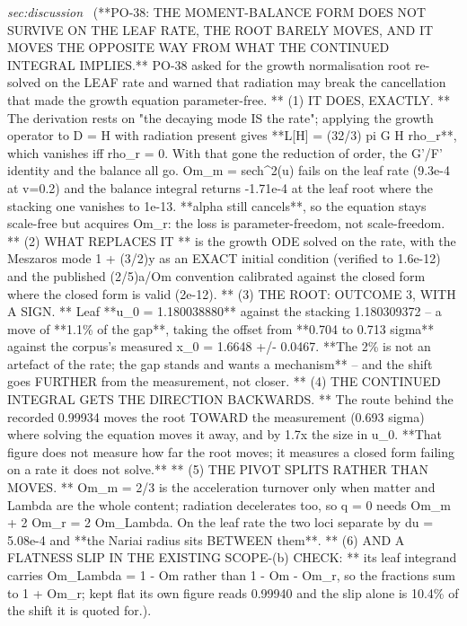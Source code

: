 \begin{description}
\textit{sec:discussion} \ (**PO-38: THE MOMENT-BALANCE FORM DOES NOT SURVIVE ON THE LEAF RATE, THE ROOT BARELY MOVES, AND IT MOVES THE OPPOSITE WAY FROM WHAT THE CONTINUED INTEGRAL IMPLIES.** PO-38 asked for the growth normalisation root re-solved on the LEAF rate and warned that radiation may break the cancellation that made the growth equation parameter-free. ** (1) IT DOES, EXACTLY. ** The derivation rests on "the decaying mode IS the rate"; applying the growth operator to D = H with radiation present gives **L[H] = (32/3) pi G H rho\_r**, which vanishes iff rho\_r = 0. With that gone the reduction of order, the G'/F' identity and the balance all go. Om\_m = sech\textasciicircum{}2(u) fails on the leaf rate (9.3e-4 at v=0.2) and the balance integral returns -1.71e-4 at the leaf root where the stacking one vanishes to 1e-13. **alpha still cancels**, so the equation stays scale-free but acquires Om\_r: the loss is parameter-freedom, not scale-freedom. ** (2) WHAT REPLACES IT ** is the growth ODE solved on the rate, with the Meszaros mode 1 + (3/2)y as an EXACT initial condition (verified to 1.6e-12) and the published (2/5)a/Om convention calibrated against the closed form where the closed form is valid (2e-12). ** (3) THE ROOT: OUTCOME 3, WITH A SIGN. ** Leaf **u\_0 = 1.180038880** against the stacking 1.180309372 -- a move of **1.1\% of the gap**, taking the offset from **0.704 to 0.713 sigma** against the corpus's measured x\_0 = 1.6648 +/- 0.0467. **The 2\% is not an artefact of the rate; the gap stands and wants a mechanism** -- and the shift goes FURTHER from the measurement, not closer. ** (4) THE CONTINUED INTEGRAL GETS THE DIRECTION BACKWARDS. ** The route behind the recorded 0.99934 moves the root TOWARD the measurement (0.693 sigma) where solving the equation moves it away, and by 1.7x the size in u\_0. **That figure does not measure how far the root moves; it measures a closed form failing on a rate it does not solve.** ** (5) THE PIVOT SPLITS RATHER THAN MOVES. ** Om\_m = 2/3 is the acceleration turnover only when matter and Lambda are the whole content; radiation decelerates too, so q = 0 needs Om\_m + 2 Om\_r = 2 Om\_Lambda. On the leaf rate the two loci separate by du = 5.08e-4 and **the Nariai radius sits BETWEEN them**. ** (6) AND A FLATNESS SLIP IN THE EXISTING SCOPE-(b) CHECK: ** its leaf integrand carries Om\_Lambda = 1 - Om rather than 1 - Om - Om\_r, so the fractions sum to 1 + Om\_r; kept flat its own figure reads 0.99940 and the slip alone is 10.4\% of the shift it is quoted for.). 

\end{description}
